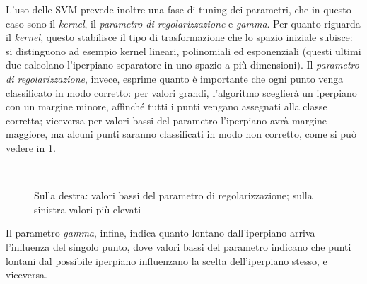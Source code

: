 \documentclass[oneside, openany]{book}
\begin{document}
	L'uso delle SVM prevede inoltre una fase di tuning dei parametri, che in questo caso sono il \textit{kernel}, il \textit{parametro di regolarizzazione} e \textit{gamma}. Per quanto riguarda il \textit{kernel}, questo stabilisce il tipo di trasformazione che lo spazio iniziale subisce: si distinguono ad esempio kernel lineari, polinomiali ed esponenziali (questi ultimi due calcolano l'iperpiano separatore in uno spazio a più dimensioni). Il \textit{parametro di regolarizzazione}, invece, esprime quanto è importante che ogni punto venga classificato in modo corretto: per valori grandi, l'algoritmo sceglierà un iperpiano con un margine minore, affinché tutti i punti vengano assegnati alla classe corretta; viceversa per valori bassi del parametro l'iperpiano avrà margine maggiore, ma alcuni punti saranno classificati in modo non corretto, come si può vedere in \ref{fig:svm}.
	
	\begin{figure}[h]
		\centering
		 \quad
		 \\
		\caption{Sulla destra: valori bassi del parametro di regolarizzazione; sulla sinistra valori più elevati}
		\label{fig:svm}
	\end{figure}
	Il parametro \textit{gamma}, infine, indica quanto lontano dall'iperpiano arriva l'influenza del singolo punto, dove valori bassi del parametro indicano che punti lontani dal possibile iperpiano influenzano la scelta dell'iperpiano stesso, e viceversa.	
	
\end{document}
